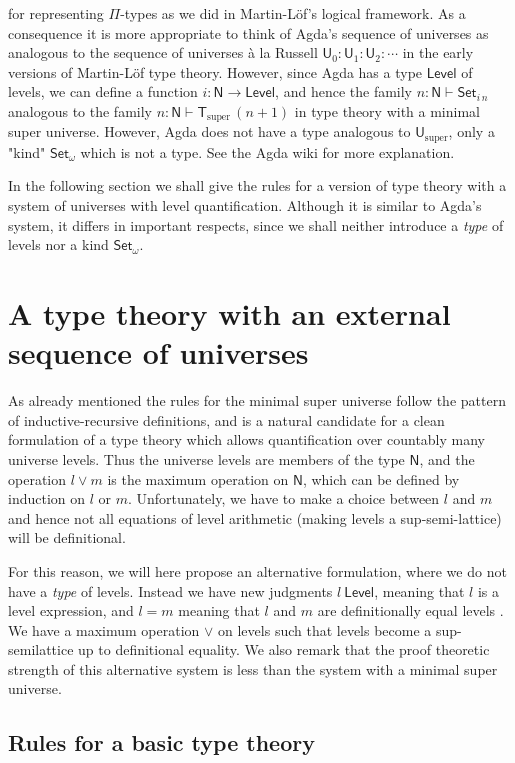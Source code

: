 \documentclass[11pt,a4paper]{article}
\def\UU{\mathsf{U}}
\def\Level{\mathsf{Level}}
\newcommand{\N}{\mathsf{N}}
\newcommand{\Set}{\mathsf{Set}}
\newcommand{\T}{\mathsf{T}}
\newcommand{\Usuper}{\UU_{\mathrm{super}}}
\newcommand{\Tsuper}{\T_{\mathrm{super}}}
\begin{document}
for representing $\Pi$-types as we did in Martin-Löf's logical framework. As a consequence it is more appropriate to think of Agda's sequence of universes as analogous to the sequence of universes  \`a la Russell $ \UU_0 : \UU_1 : \UU_2 : \cdots$ in the early versions of Martin-Löf type theory. However, since Agda has a type $\Level$ of levels, we can define a function $i : \N \to \Level$, and hence the family $n : \N \vdash \Set_{i\, n}$ analogous to the family $n : \N \vdash \Tsuper\,(n + 1)$ in type theory with a minimal super universe. However, Agda does not have a type analogous to $\Usuper$, only a "kind" $\Set_\omega$ which is not a type. See the Agda wiki for more explanation.

In the following section we shall give the rules for a version of type theory with a system of universes with level quantification. Although it is similar to Agda's system, it differs in important respects, since we shall neither introduce a {\em type} of levels nor a kind $\Set_\omega$.

\section{A type theory with an external sequence of universes}\label{sec:external}

As already mentioned the rules for the minimal super universe follow the pattern of inductive-recursive definitions, and is a natural candidate for a clean formulation of a type theory which allows quantification over countably many universe levels. Thus the universe levels are members of the type $\N$, and the operation $l \vee m$ is the maximum operation on $\N$, which can be defined by induction on $l$ or $m$. Unfortunately, we have to make a choice between $l$ and $m$ and hence not all equations of level arithmetic (making levels a sup-semi-lattice) will be definitional.

For this reason, we will here propose an alternative formulation, where we do not have a {\em type} of levels. Instead we have new judgments $l\ \Level$, meaning that $l$ is a level expression, and $l = m$ meaning that $l$ and $m$ are definitionally equal levels . We have a maximum operation $\vee$ on levels such that levels become a sup-semilattice up to definitional equality. We also remark that the proof theoretic strength of this alternative system is less than the system with a minimal super universe.

\subsection*{Rules for a basic type theory}
\end{document}
